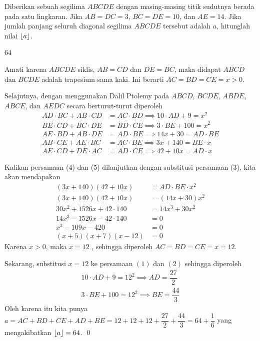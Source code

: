 \documentclass[12pt]{scrartcl}
\begin{document}
	\begin{soalbaru}
		Diberikan sebuah segilima $ABCDE$ dengan masing-masing titik sudutnya berada pada satu lingkaran. Jika $AB=DC=3$, $BC=DE=10$, dan $AE=14$. Jika jumlah panjang seluruh diagonal segilima $ABCDE$ tersebut adalah $a$, hitunglah nilai $\left\lfloor a \right\rfloor$.
		\begin{jawaban}
		64
		\end{jawaban}
		\begin{solusi}
		Amati karena $ABCDE$ siklis, $AB=CD$ dan $DE=BC$, maka didapat $ABCD$ dan $BCDE$ adalah trapesium sama kaki. Ini berarti $AC=BD=CE=x > 0$.
		
		Selajutnya, dengan menggunakan Dalil Ptolemy pada $ABCD$, $BCDE$, $ABDE$, $ABCE$, dan $AEDC$ secara berturut-turut diperoleh 
		\begin{align}
		AD \cdot BC + AB \cdot CD &= AC \cdot BD \implies 10\cdot AD+9 = x^2\\
		BE \cdot CD + BC \cdot DE &= BD \cdot CE \implies 3 \cdot BE + 100 = x^2\\
		AE \cdot BD + AB \cdot DE &= AD \cdot BE \implies 14x+30 = AD \cdot BE\\
		AB \cdot CE + AE \cdot BC &= AC \cdot BE \implies 3x+140 = BE \cdot x\\
		AE \cdot CD + DE \cdot AC &= AD \cdot CE \implies 42+10x=AD \cdot x
		\end{align}
		
		Kalikan persamaan (4) dan (5) dilanjutkan dengan substitusi persamaan (3), kita akan mendapakan 
		\begin{align*}
		(3x+140)(42+10x) &= AD \cdot BE \cdot x^2\\
		(3x+140)(42+10x) &= (14x+30)x^2\\
		30x^2+1526x+42\cdot140 &= 14x^3+30x^2\\
		14x^3-1526x-42\cdot 140 &= 0\\
		x^3-109x-420 &= 0\\
		(x+5)(x+7)(x-12) &= 0
		\end{align*}
		 Karena $x>0$, maka $x=12$ , sehingga diperoleh $AC = BD = CE = x =12$.
		 
		 Sekarang, substitusi $x=12$ ke persamaan $(1)$ dan $(2)$ sehingga diperoleh 
		 \begin{align*}
		 10\cdot AD + 9 = 12^2 \implies AD = \dfrac{27}{2}\\
		 3\cdot BE + 100 = 12^2 \implies BE = \dfrac{44}{3}
		 \end{align*}
		 Oleh karena itu kita punya $a = AC +BD +CE +AD +BE = 12+12+12+\dfrac{27}{2}+\dfrac{44}{3}=64+\dfrac{1}{6}$ yang mengakibatkan $\left\lfloor a \right\rfloor=64$. \qed
		
		\end{solusi}
	\end{soalbaru}
	
\end{document}
